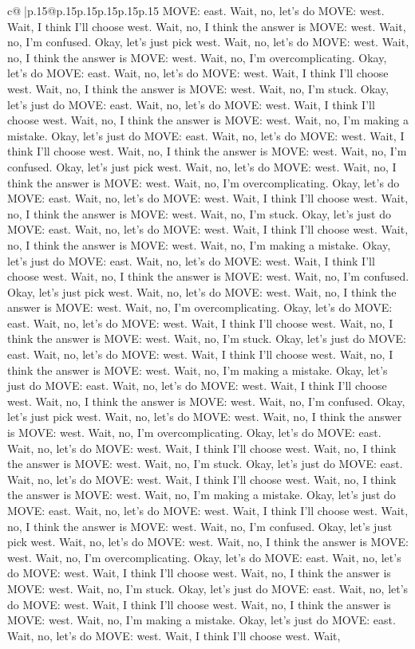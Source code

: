 \documentclass{article}
\begin{document}
{\begin{supertabular}{c@{$\;$}|p{.15\linewidth}@{}p{.15\linewidth}p{.15\linewidth}p{.15\linewidth}p{.15\linewidth}p{.15\linewidth}}
{{{MOVE: east. Wait, no, let's do MOVE: west. Wait, I think I'll choose west. Wait, no, I think the answer is MOVE: west. Wait, no, I'm confused. Okay, let's just pick west. Wait, no, let's do MOVE: west. Wait, no, I think the answer is MOVE: west. Wait, no, I'm overcomplicating. Okay, let's do MOVE: east. Wait, no, let's do MOVE: west. Wait, I think I'll choose west. Wait, no, I think the answer is MOVE: west. Wait, no, I'm stuck. Okay, let's just do MOVE: east. Wait, no, let's do MOVE: west. Wait, I think I'll choose west. Wait, no, I think the answer is MOVE: west. Wait, no, I'm making a mistake. Okay, let's just do MOVE: east. Wait, no, let's do MOVE: west. Wait, I think I'll choose west. Wait, no, I think the answer is MOVE: west. Wait, no, I'm confused. Okay, let's just pick west. Wait, no, let's do MOVE: west. Wait, no, I think the answer is MOVE: west. Wait, no, I'm overcomplicating. Okay, let's do MOVE: east. Wait, no, let's do MOVE: west. Wait, I think I'll choose west. Wait, no, I think the answer is MOVE: west. Wait, no, I'm stuck. Okay, let's just do MOVE: east. Wait, no, let's do MOVE: west. Wait, I think I'll choose west. Wait, no, I think the answer is MOVE: west. Wait, no, I'm making a mistake. Okay, let's just do MOVE: east. Wait, no, let's do MOVE: west. Wait, I think I'll choose west. Wait, no, I think the answer is MOVE: west. Wait, no, I'm confused. Okay, let's just pick west. Wait, no, let's do MOVE: west. Wait, no, I think the answer is MOVE: west. Wait, no, I'm overcomplicating. Okay, let's do MOVE: east. Wait, no, let's do MOVE: west. Wait, I think I'll choose west. Wait, no, I think the answer is MOVE: west. Wait, no, I'm stuck. Okay, let's just do MOVE: east. Wait, no, let's do MOVE: west. Wait, I think I'll choose west. Wait, no, I think the answer is MOVE: west. Wait, no, I'm making a mistake. Okay, let's just do MOVE: east. Wait, no, let's do MOVE: west. Wait, I think I'll choose west. Wait, no, I think the answer is MOVE: west. Wait, no, I'm confused. Okay, let's just pick west. Wait, no, let's do MOVE: west. Wait, no, I think the answer is MOVE: west. Wait, no, I'm overcomplicating. Okay, let's do MOVE: east. Wait, no, let's do MOVE: west. Wait, I think I'll choose west. Wait, no, I think the answer is MOVE: west. Wait, no, I'm stuck. Okay, let's just do MOVE: east. Wait, no, let's do MOVE: west. Wait, I think I'll choose west. Wait, no, I think the answer is MOVE: west. Wait, no, I'm making a mistake. Okay, let's just do MOVE: east. Wait, no, let's do MOVE: west. Wait, I think I'll choose west. Wait, no, I think the answer is MOVE: west. Wait, no, I'm confused. Okay, let's just pick west. Wait, no, let's do MOVE: west. Wait, no, I think the answer is MOVE: west. Wait, no, I'm overcomplicating. Okay, let's do MOVE: east. Wait, no, let's do MOVE: west. Wait, I think I'll choose west. Wait, no, I think the answer is MOVE: west. Wait, no, I'm stuck. Okay, let's just do MOVE: east. Wait, no, let's do MOVE: west. Wait, I think I'll choose west. Wait, no, I think the answer is MOVE: west. Wait, no, I'm making a mistake. Okay, let's just do MOVE: east. Wait, no, let's do MOVE: west. Wait, I think I'll choose west. Wait, }}}
\end{supertabular}}
\end{document}
